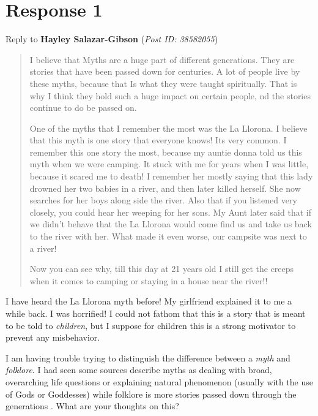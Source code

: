 \documentclass[12pt]{article}
\theoremstyle{definition}
\theoremstyle{plain}
\begin{document}
    \section{Response 1}
      \begin{mdframed}
        Reply to \textbf{Hayley Salazar-Gibson} (\textit{Post ID: 38582055})
      \end{mdframed}
      \begin{quote}
          I believe that Myths are a huge part of different generations.
            They are stories that have been passed down for centuries. A
            lot of people live by these myths, because that Is what they were
            taught spiritually. That is why I think they hold such a huge
            impact on certain people, nd the stories continue to do be passed
            on.
            
          One of the myths that I remember the most was the La Llorona.
            I believe that this myth is one story that everyone knows! Its very
            common. I remember this one story the most, because my auntie donna
            told us this myth when we were camping. It stuck with me for years
            when I was little, because it scared me to death! I remember her
            mostly saying that this lady drowned her two babies in a river, and
            then later killed herself. She now searches for her boys along side
            the river. Also that if you listened very closely, you could hear
            her weeping for her sons. My Aunt later said that if we didn't
            behave that the La Llorona would come find us and take us back to
            the river with her. What made it even worse, our campsite was next to
            a river!

          Now you can see why, till this day at 21 years old I still get the
            creeps when it comes to camping or staying in a house near the
            river!! 
      \end{quote}
      I have heard the La Llorona myth before! My girlfriend explained it to me
        a while back. I was horrified! I could not fathom that this is a story
        that is meant to be told to \textit{children}, but I suppose for children
        this is a strong motivator to prevent any misbehavior.
      
      I am having trouble trying to distinguish the difference between a
        \textit{myth} and \textit{folklore}. I had seen some sources
        describe myths as dealing with broad, overarching life questions
        or explaining natural phenomenon (usually with the use of Gods or
        Goddesses) while folklore is more stories passed down through the
        generations \autocite{lombardi_2020}. What are your thoughts on this?
\end{document}
